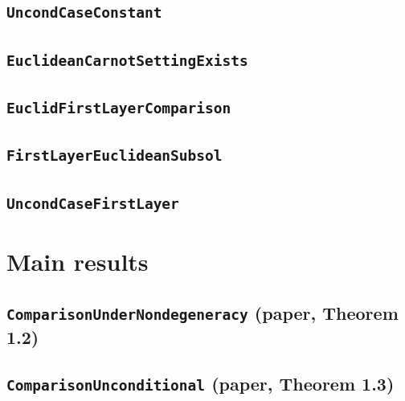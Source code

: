 \documentclass[11pt]{amsart}
\theoremstyle{definition}
\begin{document}
\subsection{\texorpdfstring{\texttt{UncondCaseConstant}}{UncondCaseConstant}}\label{node:UncondCaseConstant}


\subsection{\texorpdfstring{\texttt{EuclideanCarnotSettingExists}}{EuclideanCarnotSettingExists}}\label{node:EuclideanCarnotSettingExists}


\subsection{\texorpdfstring{\texttt{EuclidFirstLayerComparison}}{EuclidFirstLayerComparison}}\label{node:EuclidFirstLayerComparison}


\subsection{\texorpdfstring{\texttt{FirstLayerEuclideanSubsol}}{FirstLayerEuclideanSubsol}}\label{node:FirstLayerEuclideanSubsol}


\subsection{\texorpdfstring{\texttt{UncondCaseFirstLayer}}{UncondCaseFirstLayer}}\label{node:UncondCaseFirstLayer}


\section{Main results}\label{sec:main}
\subsection{\texorpdfstring{\texttt{ComparisonUnderNondegeneracy} (paper, Theorem 1.2)}{ComparisonUnderNondegeneracy}}\label{node:ComparisonUnderNondegeneracy}


\subsection{\texorpdfstring{\texttt{ComparisonUnconditional} (paper, Theorem 1.3)}{ComparisonUnconditional}}\label{node:ComparisonUnconditional}

\end{document}
